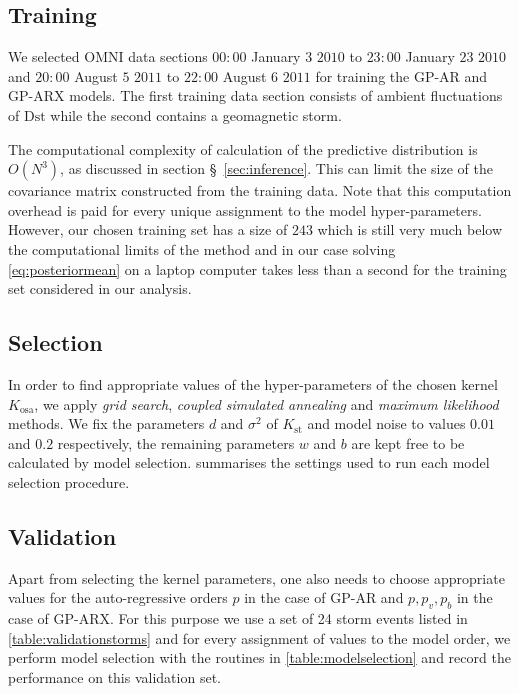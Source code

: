 \subsection*{Training}

We selected OMNI data sections $00:00$ January $3$ $2010$ to $23:00$ January $23$ $2010$ and 
$20:00$ August $5$ $2011$ to $22:00$ August $6$ $2011$ for training the GP-AR and GP-ARX models. 
The first training data section consists of ambient fluctuations of $\mathrm{Dst}$ while the second 
contains a geomagnetic storm.

The computational complexity of calculation of the predictive distribution is $O(N^3)$, as 
discussed in section \S~\ref{sec:inference}. This can limit the size of the covariance matrix 
constructed from the training data. Note that this computation overhead is paid for every unique 
assignment to the model hyper-parameters. However, our chosen training set has a size of $243$ 
which is still very much below the computational limits of the method and in our case solving 
\cref{eq:posteriormean} on a laptop computer takes less than a second for the training set 
considered in our analysis. 

\subsection*{Selection}

In order to find appropriate values of the hyper-parameters of the chosen kernel $K_{\text{osa}}$, 
we apply \emph{grid search}, \emph{coupled simulated annealing} and \emph{maximum likelihood} 
methods. We fix the parameters $d$ and $\sigma^2$ of $K_{\text{st}}$ and model noise to values 
$0.01$ and $0.2$ respectively, the remaining parameters $w$ and $b$ are kept free to be calculated 
by model selection.  summarises the settings used to run each model 
selection procedure.

\subsection*{Validation}

Apart from selecting the kernel parameters, one also needs to choose appropriate values for the 
auto-regressive orders $p$ in the case of GP-AR and $p, p_v, p_b$ in the case of GP-ARX. For this 
purpose we use a set of 24 storm events listed in \cref{table:validationstorms} and for every 
assignment of values to the model order, we perform model selection with the routines in 
\cref{table:modelselection} and record the performance on this validation set.

